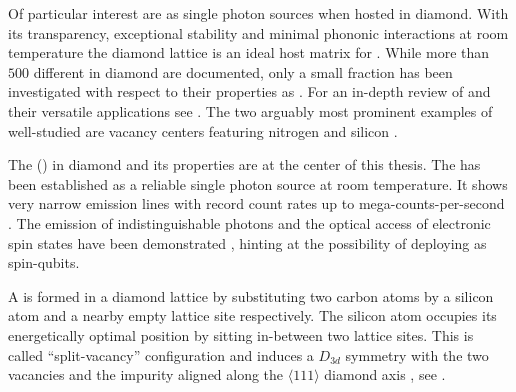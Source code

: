   Of particular interest are \ccs as single photon sources when hosted in diamond. With its transparency, exceptional stability and minimal phononic interactions at room temperature the diamond lattice is an ideal host matrix for \ccs \cite{Kennedy2003,Greentree2008}. While more than $500$ different \ccs in diamond are documented, only a small fraction has been investigated with respect to their properties as \spss \cite{Zaitsev2001}. For an in-depth review of \ccs and their versatile applications see \cite{Aharonovich2014, Prawer2014}. The two arguably most prominent examples of well-studied \ccs are vacancy centers featuring nitrogen and silicon \cite{Manson2006, Jelezko2002, Santori2006}.

  The \sivc (\siv) in diamond and its properties are at the center of this thesis. The \siv has been established as a reliable single photon source at room temperature. It shows very narrow emission lines with record count rates up to mega-counts-per-second \cite{Neu2012a}. The emission of indistinguishable photons and the optical access of electronic spin states have been demonstrated \cite{Sipahigil2014, Mueller2014, Pingault2014, Rogers2014a}, hinting at the possibility of deploying \sivs as spin-qubits.

  A \sivc is formed in a diamond lattice by substituting two carbon atoms by a silicon atom and a nearby empty lattice site respectively. The silicon atom occupies its energetically optimal position by sitting in-between two lattice sites. This is called ``split-vacancy'' configuration and induces a $D_{3d}$ symmetry with the two vacancies and the impurity aligned along the $\langle 111 \rangle$ diamond axis \cite{Goss2007}, see .

